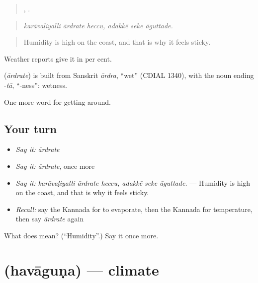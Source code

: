 \begin{quote}
  ,   .
\end{quote}

\begin{quote}
\emph{karāvaḷiyalli ārdrate heccu, adakkē seke āguttade.}
\end{quote}

\begin{quote}
Humidity is high on the coast, and that is why it feels sticky.
\end{quote}

Weather reports give it in per cent.

\begin{cousinweb}
\textbf{} (\emph{ārdrate}) is built from Sanskrit \emph{ārdra}, \textquotedblleft{}wet\textquotedblright{} (CDIAL 1340), with the noun ending -\emph{tā}, \textquotedblleft{}-ness\textquotedblright{}: wetness.
\end{cousinweb}

\begin{grammarlens}[title={What you've built}]
One more word for getting around.
\end{grammarlens}

\subsection*{Your turn}
\begin{itemize}
\raggedright
  \item \emph{Say it:} \emph{ārdrate}
  \item \emph{Say it:} \emph{ārdrate}, once more
  \item \emph{Say it:} \emph{karāvaḷiyalli ārdrate heccu, adakkē seke āguttade.} — Humidity is high on the coast, and that is why it feels sticky.
  \item \emph{Recall:} say the Kannada for to evaporate, then the Kannada for temperature, then say \emph{ārdrate} again
\end{itemize}

\begin{tcolorbox}[breakable,colback=teal!4,colframe=teal!35!black,title={Before you move on}]
What does  mean? (\textquotedblleft{}Humidity\textquotedblright{}.) Say it once more.
\end{tcolorbox}
\section[\texorpdfstring{\kn{ಹವಾಗುಣ} (havāguṇa)}{ಹವಾಗುಣ (havāguṇa)}]{ (havāguṇa) — climate}

